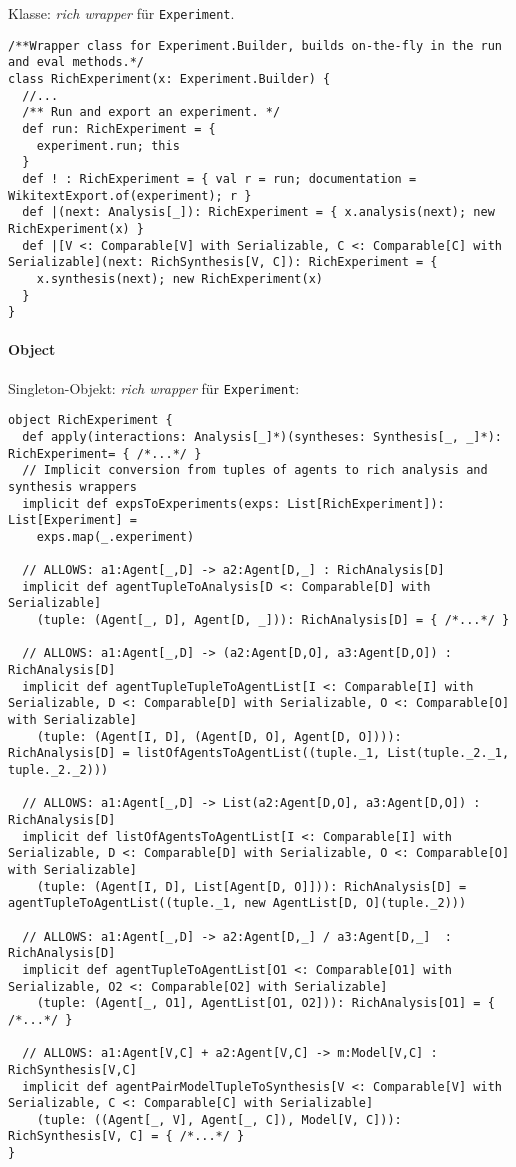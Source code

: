 \documentclass[abstracton, 12pt]{scrartcl}
\begin{document}
Klasse: \emph{rich wrapper} für \lstinline!Experiment!.

\begin{lstlisting}
/**Wrapper class for Experiment.Builder, builds on-the-fly in the run and eval methods.*/
class RichExperiment(x: Experiment.Builder) {
  //...
  /** Run and export an experiment. */
  def run: RichExperiment = {
    experiment.run; this
  }
  def ! : RichExperiment = { val r = run; documentation = WikitextExport.of(experiment); r }
  def |(next: Analysis[_]): RichExperiment = { x.analysis(next); new RichExperiment(x) }
  def |[V <: Comparable[V] with Serializable, C <: Comparable[C] with Serializable](next: RichSynthesis[V, C]): RichExperiment = {
    x.synthesis(next); new RichExperiment(x)
  }
}
\end{lstlisting}

\paragraph{Object}

Singleton-Objekt: \emph{rich wrapper} für \lstinline!Experiment!:

\begin{lstlisting}
object RichExperiment {
  def apply(interactions: Analysis[_]*)(syntheses: Synthesis[_, _]*): RichExperiment= { /*...*/ }
  // Implicit conversion from tuples of agents to rich analysis and synthesis wrappers
  implicit def expsToExperiments(exps: List[RichExperiment]): List[Experiment] =
    exps.map(_.experiment)
  
  // ALLOWS: a1:Agent[_,D] -> a2:Agent[D,_] : RichAnalysis[D]
  implicit def agentTupleToAnalysis[D <: Comparable[D] with Serializable]
  	(tuple: (Agent[_, D], Agent[D, _])): RichAnalysis[D] = { /*...*/ }
  
  // ALLOWS: a1:Agent[_,D] -> (a2:Agent[D,O], a3:Agent[D,O]) : RichAnalysis[D]
  implicit def agentTupleTupleToAgentList[I <: Comparable[I] with Serializable, D <: Comparable[D] with Serializable, O <: Comparable[O] with Serializable]
  	(tuple: (Agent[I, D], (Agent[D, O], Agent[D, O]))): RichAnalysis[D] = listOfAgentsToAgentList((tuple._1, List(tuple._2._1, tuple._2._2)))
  
  // ALLOWS: a1:Agent[_,D] -> List(a2:Agent[D,O], a3:Agent[D,O]) : RichAnalysis[D]
  implicit def listOfAgentsToAgentList[I <: Comparable[I] with Serializable, D <: Comparable[D] with Serializable, O <: Comparable[O] with Serializable]
  	(tuple: (Agent[I, D], List[Agent[D, O]])): RichAnalysis[D] = agentTupleToAgentList((tuple._1, new AgentList[D, O](tuple._2)))
  
  // ALLOWS: a1:Agent[_,D] -> a2:Agent[D,_] / a3:Agent[D,_]  : RichAnalysis[D]
  implicit def agentTupleToAgentList[O1 <: Comparable[O1] with Serializable, O2 <: Comparable[O2] with Serializable]
  	(tuple: (Agent[_, O1], AgentList[O1, O2])): RichAnalysis[O1] = { /*...*/ }
  
  // ALLOWS: a1:Agent[V,C] + a2:Agent[V,C] -> m:Model[V,C] : RichSynthesis[V,C]
  implicit def agentPairModelTupleToSynthesis[V <: Comparable[V] with Serializable, C <: Comparable[C] with Serializable]
  	(tuple: ((Agent[_, V], Agent[_, C]), Model[V, C])): RichSynthesis[V, C] = { /*...*/ }
}
\end{lstlisting}
\end{document}
